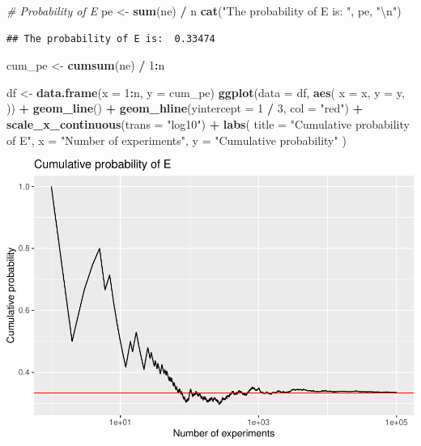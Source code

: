 \documentclass[
]{article}
\newenvironment{Shaded}{\begin{snugshade}}{\end{snugshade}}
\newcommand{\CharTok}[1]{\textcolor[rgb]{0.31,0.60,0.02}{#1}}
\newcommand{\CommentTok}[1]{\textcolor[rgb]{0.56,0.35,0.01}{\textit{#1}}}
\newcommand{\DataTypeTok}[1]{\textcolor[rgb]{0.13,0.29,0.53}{#1}}
\newcommand{\DecValTok}[1]{\textcolor[rgb]{0.00,0.00,0.81}{#1}}
\newcommand{\KeywordTok}[1]{\textcolor[rgb]{0.13,0.29,0.53}{\textbf{#1}}}
\newcommand{\NormalTok}[1]{#1}
\newcommand{\OperatorTok}[1]{\textcolor[rgb]{0.81,0.36,0.00}{\textbf{#1}}}
\newcommand{\StringTok}[1]{\textcolor[rgb]{0.31,0.60,0.02}{#1}}
\begin{document}
\begin{Shaded}
\begin{Highlighting}[]
\CommentTok{\# Probability of E}
\NormalTok{pe \textless{}{-}}\StringTok{ }\KeywordTok{sum}\NormalTok{(ne) }\OperatorTok{/}\StringTok{ }\NormalTok{n}
\KeywordTok{cat}\NormalTok{(}\StringTok{"The probability of E is: "}\NormalTok{, pe, }\StringTok{"}\CharTok{\textbackslash{}n}\StringTok{"}\NormalTok{)}
\end{Highlighting}
\end{Shaded}

\begin{verbatim}
## The probability of E is:  0.33474
\end{verbatim}

\begin{Shaded}
\begin{Highlighting}[]
\NormalTok{cum\_pe \textless{}{-}}\StringTok{ }\KeywordTok{cumsum}\NormalTok{(ne) }\OperatorTok{/}\StringTok{ }\DecValTok{1}\OperatorTok{:}\NormalTok{n}

\NormalTok{df \textless{}{-}}\StringTok{ }\KeywordTok{data.frame}\NormalTok{(}\DataTypeTok{x =} \DecValTok{1}\OperatorTok{:}\NormalTok{n, }\DataTypeTok{y =}\NormalTok{ cum\_pe)}
\KeywordTok{ggplot}\NormalTok{(}\DataTypeTok{data =}\NormalTok{ df, }\KeywordTok{aes}\NormalTok{(}
  \DataTypeTok{x =}\NormalTok{ x, }\DataTypeTok{y =}\NormalTok{ y,}
\NormalTok{)) }\OperatorTok{+}
\StringTok{  }\KeywordTok{geom\_line}\NormalTok{() }\OperatorTok{+}
\StringTok{  }\KeywordTok{geom\_hline}\NormalTok{(}\DataTypeTok{yintercept =} \DecValTok{1} \OperatorTok{/}\StringTok{ }\DecValTok{3}\NormalTok{, }\DataTypeTok{col =} \StringTok{"red"}\NormalTok{) }\OperatorTok{+}
\StringTok{  }\KeywordTok{scale\_x\_continuous}\NormalTok{(}\DataTypeTok{trans =} \StringTok{"log10"}\NormalTok{) }\OperatorTok{+}
\StringTok{  }\KeywordTok{labs}\NormalTok{(}
    \DataTypeTok{title =} \StringTok{"Cumulative probability of E"}\NormalTok{,}
    \DataTypeTok{x =} \StringTok{"Number of experiments"}\NormalTok{, }\DataTypeTok{y =} \StringTok{"Cumulative probability"}
\NormalTok{  )}
\end{Highlighting}
\end{Shaded}

\includegraphics{es_files/figure-latex/unnamed-chunk-6-1.pdf}
\end{document}
